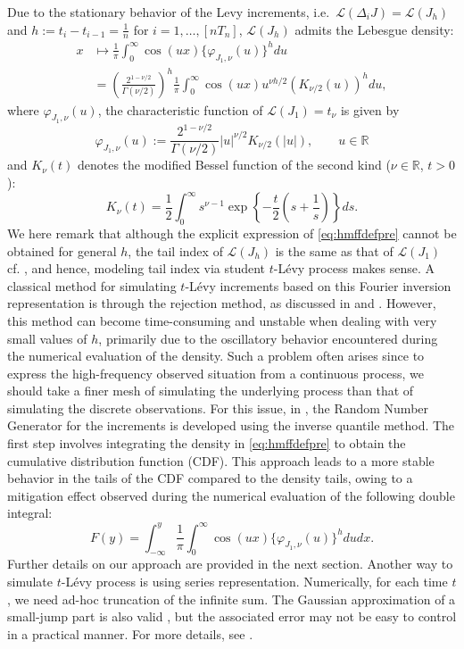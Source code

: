 Due to the stationary behavior of the L\textquotesingle evy increments, i.e.~\(\mathcal{L}(\Delta_i J) = \mathcal{L}(J_h)\)
and \(h:=t_i-t_{i-1}=\frac{1}{n}\) for \(i = 1,\ldots, [nT_n]\), \(\mathcal{L}(J_h)\) admits the Lebesgue density:
\begin{align}
x &\mapsto
\frac{1}{\pi}\int_0^\infty \cos(ux)\{\varphi_{J_1,\nu}(u)\}^h du
\nonumber\\
&= \left(\frac{2^{1-\nu/2}}{\Gamma(\nu/2)} \right)^h
\frac{1}{\pi}\int_0^\infty \cos(ux) u^{\nu h/2} \left(K_{\nu/2}(u)\right)^h du,
\label{eq:hmffdefpre}
\end{align}
where \(\varphi_{J_1,\nu}(u)\), the characteristic function of \(\mathcal{L}(J_1)=t_\nu\) is given by
\begin{equation}
\varphi_{J_1,\nu}(u) := \frac{2^{1-\nu/2}}{\Gamma(\nu/2)} |u|^{\nu/2} K_{\nu/2}(|u|), \qquad u\in\mathbb{R}
\label{eq:hmtnuCF}
\end{equation}
and \(K_\nu(t)\) denotes the modified Bessel function of the second kind (\(\nu\in\mathbb{R}\), \(t>0\)):
\begin{equation*}
K_{\nu}(t)=\frac{1}{2}\int_0^{\infty}s^{\nu-1}\exp\left\{-\frac{t}{2}\left(s+\frac{1}{s}\right)\right\}ds.
\end{equation*}
We here remark that although the explicit expression of \eqref{eq:hmffdefpre} cannot be obtained for general \(h\), the tail index of \(\mathcal{L}(J_h)\) is the same as that of \(\mathcal{L}(J_1)\) cf. \citep[ Theorem 2]{BerVig08}, and hence, modeling tail index via student \(t\)-Lévy process makes sense.
A classical method for simulating \(t\)-Lévy increments based on this Fourier inversion representation is through the rejection method, as discussed in \citet{Hubalek2005OnSF} and \citet{Dev81}. However, this method can become time-consuming and unstable when dealing with very small values of \(h\), primarily due to the oscillatory behavior encountered during the numerical evaluation of the density.
Such a problem often arises since to express the high-frequency observed situation from a continuous process, we should take a finer mesh of simulating the underlying process than that of simulating the discrete observations.
For this issue, in , the Random Number Generator for the increments is developed using the inverse quantile method. The first step involves integrating the density in \eqref{eq:hmffdefpre} to obtain the cumulative distribution function (CDF). This approach leads to a more stable behavior in the tails of the CDF compared to the density tails, owing to a mitigation effect observed during the numerical evaluation of the following double integral:
\begin{equation*}
F(y) =\int_{-\infty}^{y} \frac{1}{\pi}\int_0^\infty \cos(ux)\{\varphi_{J_1,\nu}(u)\}^h du dx.
\end{equation*}
Further details on our approach are provided in the next section.
Another way to simulate \(t\)-Lévy process is using series representation. Numerically, for each time \(t\), we need ad-hoc truncation of the infinite sum.
The Gaussian approximation of a small-jump part is also valid \citep{AsmRos01}, but the associated error may not be easy to control in a practical manner.
For more details, see \citet{Mass18}.

